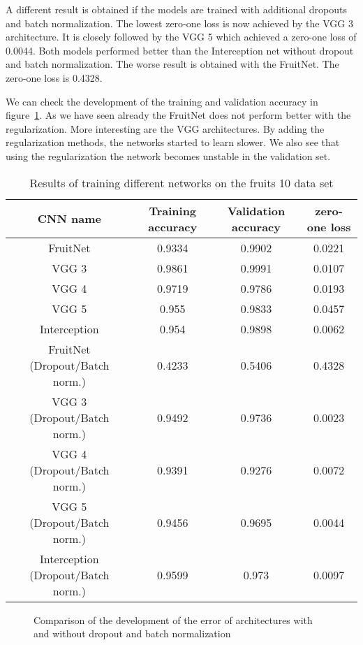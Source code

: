 \documentclass[11pt, a4paper]{article}
\begin{document}
A different result is obtained if the models are trained with additional dropouts and batch normalization. The lowest zero-one loss is now achieved by the VGG 3 architecture. It is closely followed by the VGG 5 which achieved a zero-one loss of 0.0044. Both models performed better than the Interception net without dropout and batch normalization. The worse result is obtained with the FruitNet. The zero-one loss is 0.4328.   

We can check the development of the training and validation accuracy in figure~\ref{fig:acc_full}. As we have seen already the FruitNet does not perform better with the regularization. More interesting are the VGG architectures. By adding the regularization methods, the networks started to learn slower. We also see that using the regularization the network becomes unstable in the validation set. 


\begin{table}
\begin{tabular}{c|c|c|c}
\hline
CNN name & Training accuracy & Validation accuracy & zero-one loss \\
\hline
FruitNet & 0.9334 & 0.9902 & 0.0221 \\
VGG 3 & 0.9861 & 0.9991 & 0.0107 \\
VGG 4 & 0.9719 & 0.9786 & 0.0193 \\
VGG 5 & 0.955 & 0.9833 & 0.0457 \\
Interception & 0.954 & 0.9898 & 0.0062 \\
\hline
\hline
FruitNet 
(Dropout/Batch norm.) & 0.4233 & 0.5406 & 0.4328\\
VGG 3
(Dropout/Batch norm.) & 0.9492 & 0.9736 & 0.0023\\
VGG 4
(Dropout/Batch norm.) & 0.9391 & 0.9276 & 0.0072\\
VGG 5
(Dropout/Batch norm.) & 0.9456 & 0.9695 & 0.0044\\
Interception
(Dropout/Batch norm.) & 0.9599 & 0.973 & 0.0097\\
\hline
\end{tabular}
\caption{Results of training different networks on the fruits 10 data set}
\label{tab: results_exp}
\end{table}

\begin{figure}
\centering
    \hfill
    \hfill
    \hfill
    \hfill
    \caption{Comparison of the development of the error of architectures with and without 		dropout and batch normalization}
    \label{fig:acc_full}
\end{figure}
\end{document}
